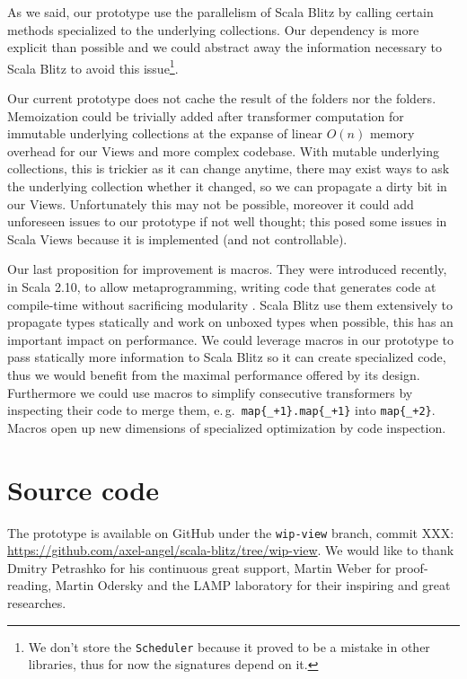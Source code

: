 \documentclass[a4paper,12pt,twocolumn]{article}
\newcommand{\eg}{e.\,g.\ }
\begin{document}
As we said, our prototype use the parallelism of Scala Blitz by calling certain methods specialized to the underlying collections.
Our dependency is more explicit than possible and we could abstract away the information necessary to Scala Blitz to avoid this issue\footnote{We don't store the {\tt Scheduler} because it proved to be a mistake in other libraries, thus for now the signatures depend on it.}.


Our current prototype does not cache the result of the folders nor the folders.
Memoization could be trivially added after transformer computation for immutable underlying collections at the expanse of linear $O(n)$ memory overhead for our Views and more complex codebase.
With mutable underlying collections, this is trickier as it can change anytime, there may exist ways to ask the underlying collection whether it changed, so we can propagate a dirty bit in our Views.
Unfortunately this may not be possible, moreover it could add unforeseen issues to our prototype if not well thought; this posed some issues in Scala Views because it is implemented (and not controllable).

Our last proposition for improvement is macros.
They were introduced recently, in Scala 2.10, to allow metaprogramming, writing code that generates code at compile-time without sacrificing modularity \cite{scala-macros}.
Scala Blitz use them extensively to propagate types statically and work on unboxed types when possible, this has an important impact on performance.
We could leverage macros in our prototype to pass statically more information to Scala Blitz so it can create specialized code, thus we would benefit from the maximal performance offered by its design.
Furthermore we could use macros to simplify consecutive transformers by inspecting their code to merge them, \eg \verb|map{_+1}.map{_+1}| into \verb|map{_+2}|.
Macros open up new dimensions of specialized optimization by code inspection.

\appendix
\section{Source code}
The prototype is available on GitHub under the \verb|wip-view| branch, commit XXX:
\url{https://github.com/axel-angel/scala-blitz/tree/wip-view}.
We would like to thank Dmitry Petrashko for his continuous great support, Martin Weber for proof-reading, Martin Odersky and the LAMP laboratory for their inspiring and great researches.


{}


\nocite{scala-bitrot}
\end{document}
